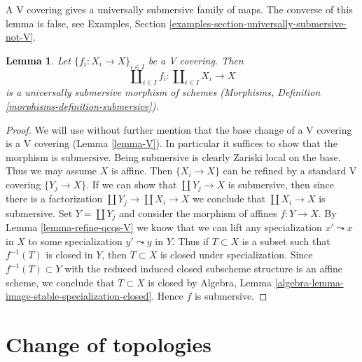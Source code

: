 \documentclass{stacks-project}
\theoremstyle{plain}
\newtheorem{lemma}[subsection]{Lemma}
\theoremstyle{definition}
\theoremstyle{remark}
\numberwithin{equation}{subsection}
\begin{document}
\noindent
A V covering gives a universally submersive family of maps.
The converse of this lemma is false, see
Examples, Section \ref{examples-section-universally-submersive-not-V}.

\begin{lemma}
\label{lemma-V-covering-universally-submersive}
Let $\{f_i : X_i \to X\}_{i \in I}$ be a V covering.
Then
$$
\coprod\nolimits_{i \in I} f_i :
\coprod\nolimits_{i \in I} X_i
\longrightarrow
X
$$
is a universally submersive morphism of schemes (Morphisms, Definition
\ref{morphisms-definition-submersive}).
\end{lemma}

\begin{proof}
We will use without further mention that the base change of a V covering
is a V covering (Lemma \ref{lemma-V}). In particular it suffices
to show that the morphism is submersive.
Being submersive is clearly Zariski local on the base.
Thus we may assume $X$ is affine. Then $\{X_i \to X\}$
can be refined by a standard V covering $\{Y_j \to X\}$.
If we can show that $\coprod Y_j \to X$ is submersive,
then since there is a factorization $\coprod Y_j \to \coprod X_i \to X$
we conclude that $\coprod X_i \to X$ is submersive.
Set $Y = \coprod Y_j$ and consider the morphism of affines
$f : Y \to X$.
By Lemma \ref{lemma-refine-qcqs-V} we know that we can lift any
specialization $x' \leadsto x$ in $X$ to some specialization
$y' \leadsto y$ in $Y$.
Thus if $T \subset X$ is a subset such that $f^{-1}(T)$
is closed in $Y$, then $T \subset X$ is closed under specialization.
Since $f^{-1}(T) \subset Y$
with the reduced induced closed subscheme structure
is an affine scheme, we conclude that $T \subset X$ is closed by
Algebra, Lemma \ref{algebra-lemma-image-stable-specialization-closed}.
Hence $f$ is submersive.
\end{proof}





















\section{Change of topologies}
\label{section-change-topologies}
\end{document}
